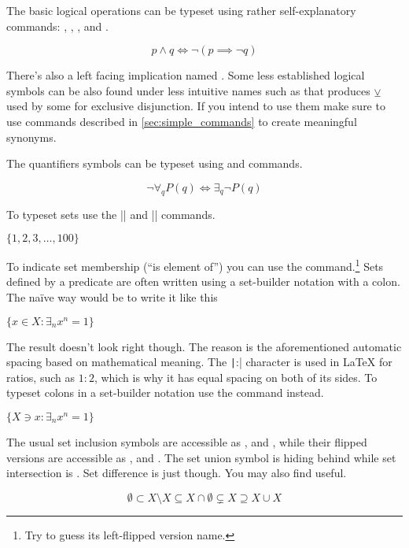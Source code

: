 The basic logical operations can be typeset using rather self-explanatory
commands: , , ,  and .
\begin{example}
\[
  p \land q \iff 
  \lnot (p \implies \lnot q) 
\]
\end{example}
There's also a left facing implication named . Some less
established logical symbols can be also found under less intuitive names such
as  that produces \(\veebar\) used by some for exclusive
disjunction. If you intend to use them make sure to use commands described in
\autoref{sec:simple_commands} to create meaningful synonyms.

The quantifiers symbols can be typeset using  and 
commands.
\begin{example}
\[
  \lnot\forall_{q} P(q) \iff
  \exists_{q}\lnot P(q)
\]
\end{example}

To typeset sets use the \csiv|{| and \csiv|}| commands.
\begin{example}
\( \{1, 2, 3, \ldots, 100\} \)
\end{example}
To indicate set membership (\enquote{is element of}) you can use the 
command.\footnote{Try to guess its left-flipped version name.} Sets defined by
a predicate are often written using a set-builder notation with a colon. The
naïve way would be to write it like this
\begin{example}
\( \{x \in X:
  \exists_n x^n = 1\} \)
\end{example}
The result doesn't look right though. The reason is the aforementioned
automatic spacing based on mathematical meaning. The \texttt|:|
character is used in \LaTeX{} for ratios, such as \(1:2\), which is why it has
equal spacing on both of its sides. To typeset colons in a set-builder notation
use the  command instead.
\begin{example}
\(\{ X \ni x\colon
  \exists_n x^n = 1\} \)
\end{example}

The usual set inclusion symbols are accessible as , 
and , while their flipped versions are accessible as
,  and . The set union symbol is
hiding behind  while set intersection is . Set difference is
just  though. You may also find  useful.
\begin{example}
\RenewDocumentCommand{\setminus}{}{\smallsetminus}
\[
  \emptyset
  \subset X \setminus X
  \subseteq X \cap \emptyset
  \subsetneq X
  \supseteq X \cup X
\]
\end{example}

